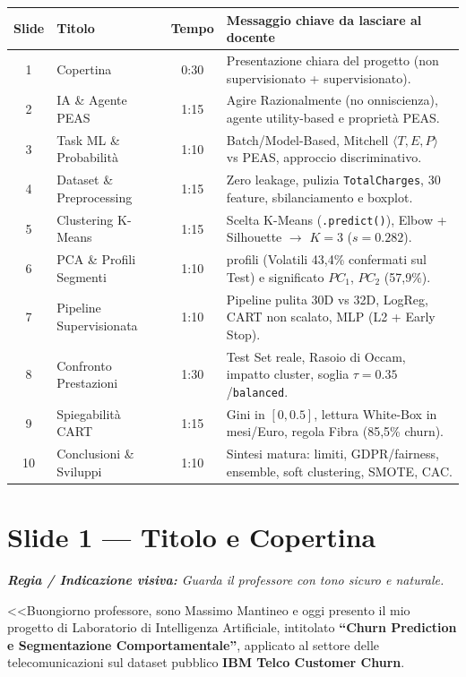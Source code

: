 \documentclass[10pt, a4paper]{article}
\newcommand{\cue}[1]{%
  \par\vspace{2pt}\noindent\colorbox{CueBg}{\parbox{\dimexpr\linewidth-2\fboxsep}{\footnotesize\textit{\color{PrimaryNavy}\textbf{Regia / Indicazione visiva:} #1}}}\par\vspace{3pt}%
}
\begin{document}
\vspace{2mm}
\begin{center}
\footnotesize
\setlength{\tabcolsep}{5pt}
\renewcommand{\arraystretch}{1.15}
\begin{tabularx}{\textwidth}{c l c >{\raggedright\arraybackslash}X}
\toprule
\rowcolor{PrimaryNavy}
\color{white}\textbf{Slide} & \color{white}\textbf{Titolo} & \color{white}\textbf{Tempo} & \color{white}\textbf{Messaggio chiave da lasciare al docente} \\
\midrule
1 & Copertina & 0:30 & Presentazione chiara del progetto (non supervisionato + supervisionato). \\
2 & IA \& Agente PEAS & 1:15 & Agire Razionalmente (no onniscienza), agente utility-based e proprietà PEAS. \\
3 & Task ML \& Probabilità & 1:10 & Batch/Model-Based, Mitchell $\langle T,E,P\rangle$ vs PEAS, approccio discriminativo. \\
4 & Dataset \& Preprocessing & 1:15 & Zero leakage, pulizia \texttt{TotalCharges}, 30 feature, sbilanciamento e boxplot. \\
5 & Clustering K-Means & 1:15 & Scelta K-Means (\texttt{.predict()}), Elbow + Silhouette $\rightarrow$ $K=3$ ($s=0.282$). \\
6 & PCA \& Profili Segmenti & 1:10 & 3 profili (Volatili 43,4\% confermati sul Test) e significato $PC_1$, $PC_2$ (57,9\%). \\
7 & Pipeline Supervisionata & 1:10 & Pipeline pulita 30D vs 32D, LogReg, CART non scalato, MLP (L2 + Early Stop). \\
8 & Confronto Prestazioni & 1:30 & Test Set reale, Rasoio di Occam, impatto cluster, soglia $\tau=0.35$/\texttt{balanced}. \\
9 & Spiegabilità CART & 1:15 & Gini in $[0, 0.5]$, lettura White-Box in mesi/Euro, regola Fibra (85,5\% churn). \\
10 & Conclusioni \& Sviluppi & 1:10 & Sintesi matura: limiti, GDPR/fairness, ensemble, soft clustering, SMOTE, CAC. \\
\bottomrule
\end{tabularx}
\end{center}

\section*{Slide 1 --- Titolo e Copertina}
\cue{Guarda il professore con tono sicuro e naturale.}
\noindent <<Buongiorno professore, sono Massimo Mantineo e oggi presento il mio progetto di Laboratorio di Intelligenza Artificiale, intitolato \textbf{``Churn Prediction e Segmentazione Comportamentale''}, applicato al settore delle telecomunicazioni sul dataset pubblico \textbf{IBM Telco Customer Churn}.
\end{document}
